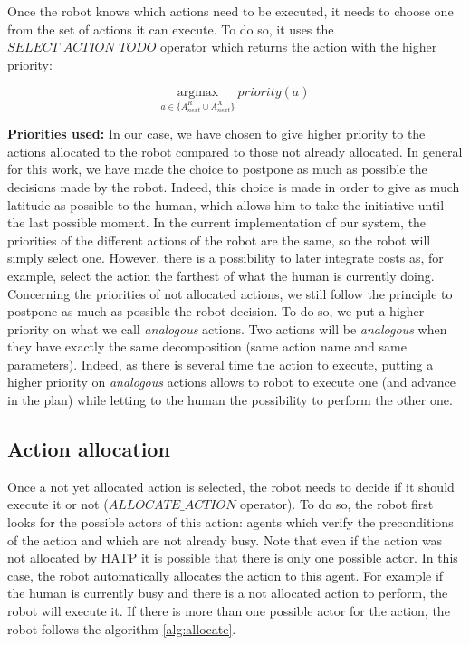 \documentclass[english,a4paper,11pt,twoside]{StyleThese}
\begin{document}
Once the robot knows which actions need to be executed, it needs to choose one from the set of actions it can execute. To do so, it uses the $SELECT\_ACTION\_TODO$ operator which returns the action with the higher priority:

$$\underset{a \in \{A^R_{next} \cup A^X_{next}\}}{\mathrm{argmax}} \ priority(a)$$

\textbf{Priorities used:}
In our case, we have chosen to give higher priority to the actions allocated to the robot compared to those not already allocated. In general for this work, we have made the choice to postpone as much as possible the decisions made by the robot. Indeed, this choice is made in order to give as much latitude as possible to the human, which allows him to take the initiative until the last possible moment. In the current implementation of our system, the priorities of the different actions of the robot are the same, so the robot will simply select one. However, there is a possibility to later integrate costs as, for example, select the action the farthest of what the human is currently doing. Concerning the priorities of not allocated actions, we still follow the principle to postpone as much as possible the robot decision. To do so, we put a higher priority on what we call \textit{analogous} actions. Two actions will be \textit{analogous} when they have exactly the same decomposition (same action name and same parameters). Indeed, as there is several time the action to execute, putting a higher priority on \textit{analogous} actions allows to robot to execute one (and advance in the plan) while letting to the human the possibility to perform the other one.

\subsection{Action allocation}
\label{subsec:allocation}

Once a not yet allocated action is selected, the robot needs to decide if it should execute it or not ($ALLOCATE\_ACTION$ operator). To do so, the robot first looks for the possible actors of this action: agents which verify the preconditions of the action and which are not already busy. Note that even if the action was not allocated by HATP it is possible that there is only one possible actor. In this case, the robot automatically allocates the action to this agent. For example if the human is currently busy and there is a not allocated action  to perform, the robot will execute it. If there is more than one possible actor for the action, the robot follows the algorithm \ref{alg:allocate}.
\end{document}
